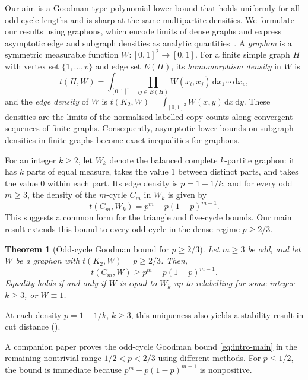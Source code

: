\documentclass[11pt]{article}
\newtheorem{theorem}{Theorem}[section]
\theoremstyle{remark}
\numberwithin{equation}{section}
\newcommand{\dd}{\,\mathrm d}
\newcommand{\dens}[2]{t(#1,#2)}
\newcommand{\tC}[2]{t(C_{#1},#2)}
\newcommand{\edens}[1]{t(K_{2},#1)}
\newcommand{\goodman}[2]{#1^{#2}-#1(1-#1)^{#2-1}}
\newcommand{\goal}{\goodman{p}{m}}
\newcommand{\intsq}{\int_{[0,1]^2}}
\newcommand{\intcube}[1]{\int_{[0,1]^{#1}}}
\newcommand{\ddxy}{\dd x\dd y}
\begin{document}
Our aim is a Goodman-type polynomial lower bound that holds uniformly for all odd cycle lengths and is sharp at the same multipartite densities.
We formulate our results using graphons, which encode limits of dense graphs and express asymptotic edge and subgraph densities as analytic quantities~\cite{lovasz2012large,lovasz2006limits}.
A \emph{graphon} is a symmetric measurable function $W\colon[0,1]^2\to[0,1]$.
For a finite simple graph $H$ with vertex set $\{1,\ldots,v\}$ and edge set $E(H)$, its \emph{homomorphism density} in $W$ is
\[
  \dens HW=\intcube{v}\prod_{ij\in E(H)}W(x_i,x_j)\dd x_1\cdots\dd x_v,
\]
and the \emph{edge density} of $W$ is $\edens W=\intsq W(x,y)\ddxy$.
These densities are the limits of the normalised labelled copy counts along convergent sequences of finite graphs.
Consequently, asymptotic lower bounds on subgraph densities in finite graphs become exact inequalities for graphons.

For an integer $k\ge2$, let $W_k$ denote the balanced complete $k$-partite graphon: it has $k$ parts of equal measure, takes the value $1$ between distinct parts, and takes the value $0$ within each part.
Its edge density is $p=1-1/k$, and for every odd $m\ge3$, the density of the $m$-cycle $C_m$ in $W_k$ is given by
\begin{equation}\label{eq:intro-kpartite-value}
  \tC m{W_k}=\goal.
\end{equation}
This suggests a common form for the triangle and five-cycle bounds.
Our main result extends this bound to every odd cycle in the dense regime $p\ge2/3$.
\begin{theorem}[Odd-cycle Goodman bound for $p\ge2/3$]\label{thm:main}
  Let $m\ge3$ be odd, and let $W$ be a graphon with $\edens W=p\ge2/3$.
  Then,
  \begin{equation}\label{eq:intro-main}
    \tC mW\ge\goal.
  \end{equation}
  Equality holds if and only if $W$ is equal to $W_k$ up to relabelling for some integer $k\ge3$, or $W\equiv1$.
\end{theorem}

At each density $p=1-1/k$, $k\ge3$, this uniqueness also yields a stability result in cut distance ().

A companion paper proves the odd-cycle Goodman bound \eqref{eq:intro-main} in the remaining nontrivial range $1/2<p<2/3$ using different methods.
For $p\le1/2$, the bound is immediate because $p^m-p(1-p)^{m-1}$ is nonpositive.
\end{document}
